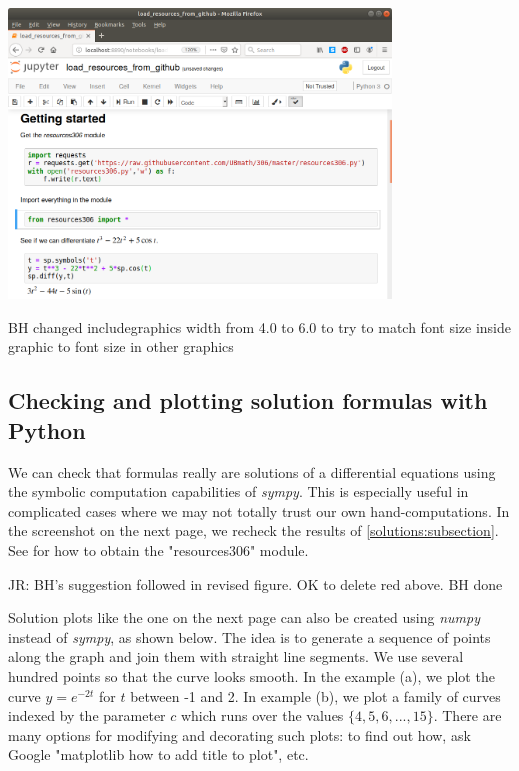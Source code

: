 \documentclass[12pt]{book}
\begin{document}
\parbox[c]{3.1in}{\includegraphics[width=4.0in]{additional_figures/Introduction_to_differential_equations__getting_started}}

{\color{teal}BH changed includegraphics width from 4.0 to 6.0 to try to match font size inside graphic to font size in other graphics}


\subsection {Checking and plotting solution formulas with Python}

We can check that formulas really are solutions of a differential equations using the symbolic
computation capabilities of \emph{sympy}. This is especially useful in complicated cases
where we may not totally trust our own hand-computations. In the screenshot on the next page, we recheck the results of \ref{solutions:subsection}.
See  for how to obtain the "resources306" module.


{\color{teal}JR: BH's suggestion followed in revised figure. OK to delete red above. BH done}

Solution plots like the one on the next page can also be created using \emph{numpy} instead of \emph{sympy}, as shown below.
The idea is to generate a sequence of points along the graph and join them with straight line segments. 
We use several hundred points so that the curve looks smooth. In the example (a),
we plot the curve $y = e^{-2t}$ for $t$ between -1 and 2. In example (b), we plot a
family of curves indexed by the parameter $c$ which runs over the values $\{4, 5, 6, ..., 15\}$.
There are many options for modifying and decorating such plots: to find out how, ask Google "matplotlib how to add title to plot", etc.
\end{document}
